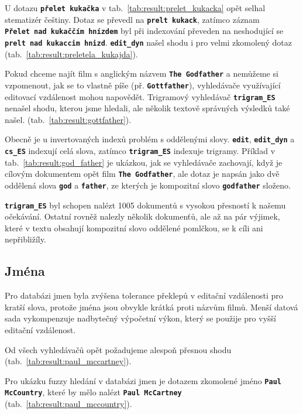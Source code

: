 \documentclass[11pt,letterpaper,oneside,openright]{book}
\newcommand{\bftt}[1]{\texttt{\textbf{#1}}}
\begin{document}
U dotazu \bftt{přelet~kukačka} v tab.~\ref{tab:result:prelet_kukacka} opět
selhal stematizér češtiny. Dotaz se převedl na \bftt{prelt~kukack}, zatímco
záznam \bftt{Přelet~nad~kukaččím~hnízdem} byl při indexování převeden na
neshodující se \bftt{prelt~nad~kukaccim~hnizd}. \bftt{edit\_dyn} našel shodu i
pro velmi zkomolený dotaz (tab.~\ref{tab:result:preletela_kukajda}).

\mbox{}\mbox{}

Pokud chceme najít film s anglickým názvem \bftt{The Godfather} a nemůžeme si
vzpomenout, jak se to vlastně píše (př. \bftt{Gottfather}), vyhledávače
využívající editovací vzdálenost mohou napovědět. Trigramový vyhledávač
\bftt{trigram\_ES} nenašel shodu, kterou jsme hledali, ale několik textově
správných výsledků také našel.  (tab.~\ref{tab:result:gottfather}).

\mbox{}\mbox{}

Obecně je u invertovaných indexů problém s oddělenými slovy. \bftt{edit},
\bftt{edit\_dyn} a \bftt{cs\_ES} indexují celá slova, zatímco
\bftt{trigram\_ES} indexuje trigramy. Příklad v
tab.~\ref{tab:result:god_father} je ukázkou, jak se vyhledávače zachovají, když
je cílovým dokumentem opět film \bftt{The Godfather}, ale dotaz je napsán jako
dvě oddělená slova \bftt{god} a \bftt{father}, ze kterých je kompozitní slovo
\bftt{godfather} složeno.

\bftt{trigram\_ES} byl schopen nalézt 1005 dokumentů s vysokou přesností k
našemu očekávání. Ostatní rovněž nalezly několik dokumenťů, ale až na pár
výjimek, které v textu obsahují kompozitní slovo oddělené pomlčkou, se k cíli
ani nepřibližíly.

\subsection{Jména}
Pro databázi jmen byla zvýšena tolerance překlepů v editační vzdálenosti pro
kratší slova, protože jména jsou obvykle krátká proti názvům filmů. Menší
datová sada vykompenzuje nadbytečný výpočetní výkon, který se použije pro vyšší
editační vzdálenost.

\mbox{}\mbox{}

Od všech vyhledávačů opět požadujeme alespoň přesnou shodu
(tab.~\ref{tab:result:paul_mccartney}).

\mbox{}\mbox{}

Pro ukázku fuzzy hledání v databázi jmen je dotazem zkomolené jméno
\bftt{Paul McCountry}, které by mělo nalézt \bftt{Paul McCartney}
(tab.~\ref{tab:result:paul_mccountry}).
\end{document}
